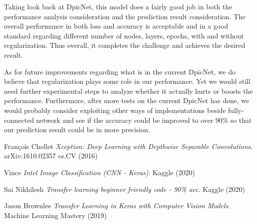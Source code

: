 \documentclass{article}
\begin{document}
Taking look back at DpicNet, this model does a fairly good job in both the performance analysis consideration and the prediction result consideration. The overall performance in both loss and accuracy is acceptable and in a good standard regarding different number of nodes, layers, epochs, with and without regularization. Thus overall, it completes the challenge and achieves the desired result.

As for future improvements regarding what is in the current DpicNet, we do believe that regularization plays some role in our performance. Yet we would still need further experimental steps to analyze whether it actually hurts or boosts the performance. Furthermore, after more tests on the current DpicNet has done, we would probably consider exploiting other ways of implementations beside fully-connected network and see if the accuracy could be improved to over 90\% so that our prediction result could be in more precision.


\begin{thebibliography}{9}
    François Chollet
    \textit{Xception: Deep Learning with Depthwise Separable Convolutions}.
    arXiv:1610.02357 cs.CV (2016)
    
    Vince
    \textit{Intel Image Classification (CNN - Keras)}.
    Kaggle (2020)
    
    Sai Nikhilesh
    \textit{Transfer learning beginner friendly code - 90\% acc}.
    Kaggle (2020)
    
    Jason Brownlee
    \textit{Transfer Learning in Keras with Computer Vision Models}.
    Machine Learning Mastery (2019)
\end{thebibliography}
\end{document}

